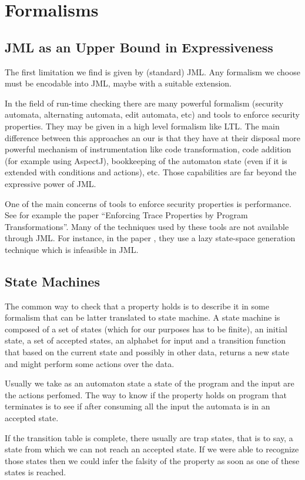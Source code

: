 \documentclass[a4paper,10pt]{article}
\begin{document}
\section{Formalisms}
\subsection*{JML as an Upper Bound in Expressiveness}
The first limitation we find is given by (standard) JML. Any formalism we choose
must be encodable into JML, maybe with a suitable extension.
  
In the field of run-time checking there are many powerful formalism (security
automata, alternating automata, edit automata, etc) and tools to enforce
security properties. They may be given in a high level formalism like LTL. The
main difference between this approaches an our is that they have at their
disposal more powerful mechanism of instrumentation like code transformation,
code addition (for example using AspectJ), bookkeeping of the automaton state
(even if it is extended with conditions and actions), etc. Those capabilities
are far beyond the expressive power of JML.

One of the main concerns of tools to enforce security properties is
performance. See for example the paper ``Enforcing Trace Properties by Program
Transformations''. Many of the techniques used by these tools are not available
through JML. For instance, in the paper \cite{StolzBodden06}, they use a lazy
state-space generation technique which is infeasible in JML.

\subsection*{State Machines}
The common way to check that a property holds is to describe it in some
formalism that can be latter translated to state machine. A state machine is
composed of a set of states (which for our purposes has to be finite), an
initial state, a set of accepted states, an alphabet for input and a transition
function that based on the current state and possibly in other data, returns a
new state and might perform some actions over the data.

Usually we take as an automaton state a state of the program and the input are
the actions perfomed.
The way to know if the property holds on program that terminates is to see if
after consuming all the input the automata is in an accepted state.

If the transition table is complete, there usually are trap states, that is to
say, a state from which we can not reach an accepted state. If we were able to
recognize those states then we could infer the falsity of the property as soon
as one of these states is reached.
\end{document}
